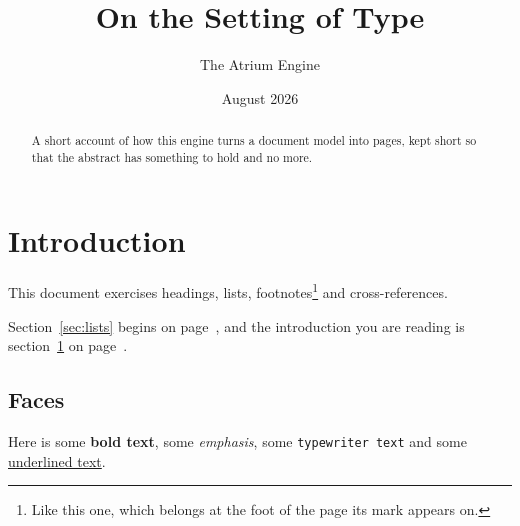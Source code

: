 \documentclass{article}
\title{On the Setting of Type}
\author{The Atrium Engine}
\date{August 2026}
\begin{document}
\maketitle

\begin{abstract}
A short account of how this engine turns a document model into pages, kept
short so that the abstract has something to hold and no more.
\end{abstract}

\tableofcontents

\section{Introduction}
\label{sec:intro}

This document exercises headings, lists, footnotes\footnote{Like this one,
which belongs at the foot of the page its mark appears on.} and
cross-references.

Section~\ref{sec:lists} begins on page~\pageref{sec:lists}, and the
introduction you are reading is section~\ref{sec:intro} on
page~\pageref{sec:intro}.

\subsection{Faces}

Here is some \textbf{bold text}, some \emph{emphasis}, some \texttt{typewriter
text} and some \underline{underlined text}.


\end{document}
